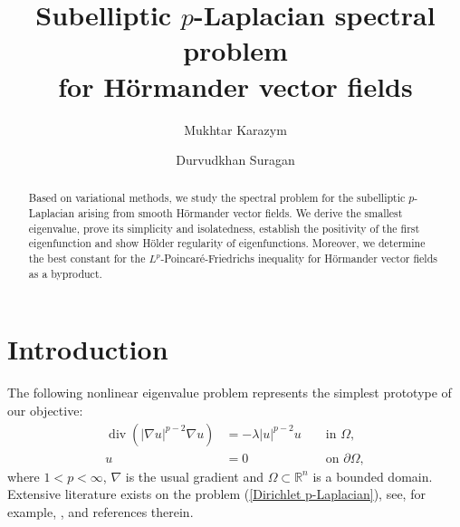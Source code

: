 \documentclass[a4paper,12pt,reqno]{amsart}
\renewcommand\eqref[1]{(\ref{#1})} %
\numberwithin{equation}{section}
\theoremstyle{plain}
\theoremstyle{definition}
\begin{document}
   \title[Subelliptic $p$-Laplacian spectral problem  for H\"ormander vector fields]
   {Subelliptic $p$-Laplacian spectral problem \\ for H\"ormander vector fields}

\author[M. Karazym]{Mukhtar Karazym}
\address{
  Mukhtar Karazym:
  \endgraf
  Department of Mathematics
  \endgraf
Nazarbayev University, Kazakhstan
  \endgraf
  {\it E-mail address} {\rm  mukhtar.karazym@nu.edu.kz; mukhtarkarazym@gmail.com}
  }

 \author[D. Suragan]{Durvudkhan Suragan}
\address{
	Durvudkhan Suragan:
	\endgraf
	Department of Mathematics
	\endgraf
Nazarbayev University, Kazakhstan
	\endgraf
	{\it E-mail address} {\rm durvudkhan.suragan@nu.edu.kz}
} 




\begin{abstract} 
Based on variational methods, we study the spectral problem for the subelliptic $p$-Laplacian  arising from smooth H\"ormander vector fields. We derive the smallest eigenvalue, prove its simplicity and  isolatedness, establish  the positivity of the first eigenfunction and show  H\"older regularity of eigenfunctions.  Moreover, we determine the best constant for the $L^{p}$-Poincar\'e-Friedrichs inequality for H\"ormander vector fields as a byproduct.
\end{abstract}
\maketitle


\section{Introduction}
The following nonlinear eigenvalue problem represents the simplest prototype of our objective:
\begin{equation}\label{Dirichlet p-Laplacian}
\begin{aligned}
\operatorname{div}\left(|\nabla u|^{p-2} \nabla u\right)&=-\lambda|u|^{p-2} u  &&\text { in } \Omega, \\
u&=0 &&\text { on } \partial \Omega,
\end{aligned}
\end{equation}
where $1<p<\infty$, $\nabla$ is the usual gradient and $\Omega\subset\mathbb{R}^{n}$ is a bounded domain.  Extensive literature exists on the problem \eqref{Dirichlet p-Laplacian}, see, for example, \cite{Bonder2015review}, \cite{lindqvist2008nonlinear} and references therein. 
\end{document}
